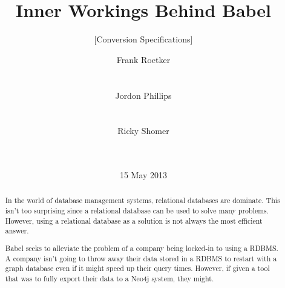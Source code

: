 \documentclass{acm_proc_article-sp}
\begin{document}
\lstset{language=SQL}

\title{Inner Workings Behind Babel
}
\subtitle{[Conversion Specifications]}

\author{
\alignauthor
Frank Roetker
       \\
       \\
       \\
\alignauthor
Jordon Phillips
       \\
       \\
       \\
\alignauthor Ricky Shomer
       \\
       \\
       \\
}
\date{15 May 2013}

\maketitle
\begin{abstract}
In the world of database management systems, relational databases are dominate. This isn't too surprising since a relational database can be used to solve many problems. However, using a relational database as a solution is not always the most efficient answer.

Babel seeks to alleviate the problem of a company being locked-in to using a RDBMS. A company isn't going to throw away their data stored in a RDBMS to restart with a graph database even if it might speed up their query times. However, if given a tool that was to fully export their data to a Neo4j system, they might. 
\end{abstract}



\end{document}
